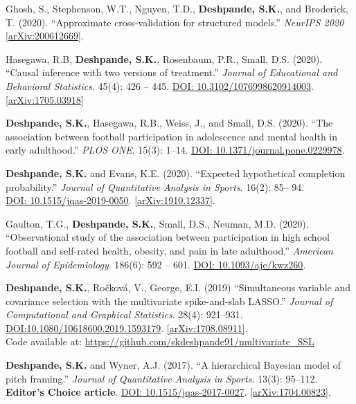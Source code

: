 \documentclass[margin]{res}
\begin{document}
\begin{resume}
Ghosh, S., Stephenson, W.T., Nguyen, T.D., \textbf{Deshpande, S.K.}, and Broderick, T. (2020). ``Approximate cross-validation for structured models.'' \textit{NeurIPS 2020} \href{https://arxiv.org/abs/2006.12669}{[arXiv:200612669]}. 

Hasegawa, R.B, \textbf{Deshpande, S.K.}, Rosenbaum, P.R., Small, D.S. (2020). ``Causal inference with two versions of treatment.'' \textit{Journal of Educational and Behavioral Statistics}. 45(4): 426 -- 445. \href{https://doi.org/10.3102/1076998620914003}{DOI: 10.3102/1076998620914003}. \href{https://arxiv.org/abs/1705.03918}{[arXiv:1705.03918]}

\textbf{Deshpande, S.K.}, Hasegawa, R.B., Weiss, J., and Small, D.S. (2020). ``The association between football participation in adolescence and mental health in early adulthood.'' \textit{PLOS ONE}. 15(3): 1--14. \href{https://doi.org/10.1371/journal.pone.0229978}{DOI: 10.1371/journal.pone.0229978}.

\textbf{Deshpande, S.K.} and Evans, K.E. (2020). ``Expected hypothetical completion probability.'' \textit{Journal of Quantitative Analysis in Sports}. 16(2): 85-- 94.\\ \href{https://doi.org/10.1515/jqas-2019-0050}{DOI: 10.1515/jqas-2019-0050}. \href{https://arxiv.org/abs/1910.12337}{[arXiv:1910.12337]}.

Gaulton, T.G., \textbf{Deshpande, S.K.}, Small, D.S., Neuman, M.D. (2020). ``Observational study of the association between participation in high school football and self-rated health, obesity, and pain in late adulthood.'' \textit{American Journal of Epidemiology}. 186(6): 592 -- 601. \href{https://doi.org/10.1093/aje/kwz260}{DOI: 10.1093/aje/kwz260}.

\textbf{Deshpande, S.K.}, Ro\v{c}kov\'{a}, V.,  George, E.I. (2019) ``Simultaneous variable and covariance selection with the multivariate spike-and-slab LASSO.'' \textit{Journal of Computational and Graphical Statistics}. 28(4): 921--931. \href{https://doi.org/10.1080/10618600.2019.1593179}{DOI:10.1080/10618600.2019.1593179}. \href{https://arxiv.org/abs/1708.08911}{[arXiv:1708.08911]}. \\ Code available at: \url{https://github.com/skdeshpande91/multivariate_SSL}

\textbf{Deshpande, S.K.} and Wyner, A.J. (2017). ``A hierarchical Bayesian model of pitch framing.'' \textit{Journal of Quantitative Analysis in Sports}. 13(3): 95--112. \textbf{Editor's Choice article}.   \href{https://doi.org/10.1515/jqas-2017-0027}{DOI: 10.1515/jqas-2017-0027}. \href{https://arxiv.org/abs/1704.00823}{[arXiv:1704.00823]}.


\end{resume}
\end{document}
